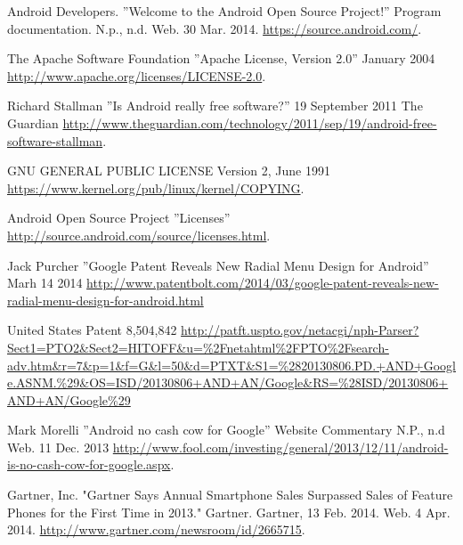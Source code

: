 \documentclass[conference]{IEEEtran}
\begin{document}
\begin{thebibliography}{1}



Android Developers. ''Welcome to the Android Open Source Project!'' Program documentation. N.p., n.d. Web. 30 Mar. 2014. \url{https://source.android.com/}.

The Apache Software Foundation ''Apache License, Version 2.0'' January 2004 \url{http://www.apache.org/licenses/LICENSE-2.0}.

Richard Stallman ''Is Android really free software?'' 19 September 2011 The Guardian \url{http://www.theguardian.com/technology/2011/sep/19/android-free-software-stallman}.

GNU GENERAL PUBLIC LICENSE Version 2, June 1991 \url{https://www.kernel.org/pub/linux/kernel/COPYING}.

Android Open Source Project ''Licenses'' \url{http://source.android.com/source/licenses.html}.

Jack Purcher ''Google Patent Reveals New Radial Menu Design for Android'' Marh 14 2014 \url{http://www.patentbolt.com/2014/03/google-patent-reveals-new-radial-menu-design-for-android.html}

United States Patent 8,504,842 \url{http://patft.uspto.gov/netacgi/nph-Parser?Sect1=PTO2&Sect2=HITOFF&u=\%2Fnetahtml\%2FPTO\%2Fsearch-adv.htm&r=7&p=1&f=G&l=50&d=PTXT&S1=\%2820130806.PD.+AND+Google.ASNM.\%29&OS=ISD/20130806+AND+AN/Google&RS=\%28ISD/20130806+AND+AN/Google\%29}

Mark Morelli ''Android no cash cow for Google'' Website Commentary N.P., n.d Web. 11 Dec. 2013 \url{http://www.fool.com/investing/general/2013/12/11/android-is-no-cash-cow-for-google.aspx}.

Gartner, Inc. "Gartner Says Annual Smartphone Sales Surpassed Sales of Feature Phones for the First Time in 2013." Gartner. Gartner, 13 Feb. 2014. Web. 4 Apr. 2014. \url{http://www.gartner.com/newsroom/id/2665715}.


\end{thebibliography}
\end{document}
